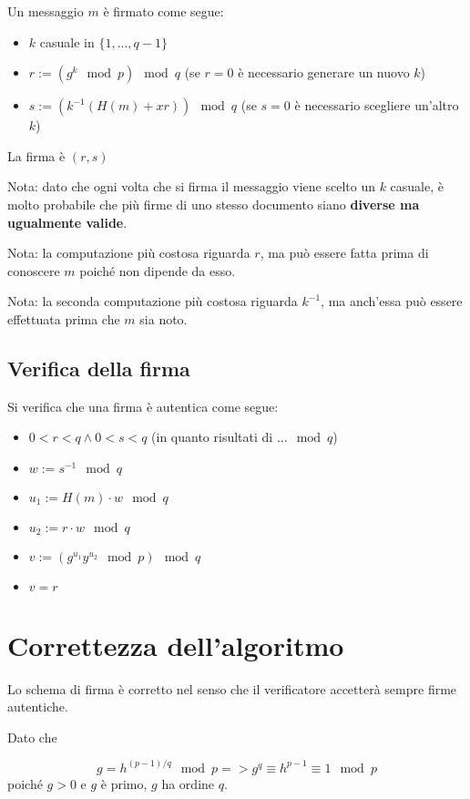 \documentclass[14pt]{extarticle}
\begin{document}
    Un messaggio $m$ è firmato come segue:
    \begin{itemize}
        \item $k$ casuale in $\{1, ..., q-1\}$
        \item $r := (g^k \mod p) \mod q$ (se $r = 0$ è necessario generare un nuovo $k$)
        \item $s := (k^{-1}(H(m) + xr)) \mod q$ (se $s = 0$ è necessario scegliere un'altro $k$)
    \end{itemize}
    La firma è $(r, s)$

    \bigskip
    Nota: dato che ogni volta che si firma il messaggio viene scelto un $k$ casuale, è molto probabile che più firme di uno stesso documento siano \textbf{diverse ma ugualmente valide}.

    \bigskip
    Nota: la computazione più costosa riguarda $r$, ma può essere fatta prima di conoscere $m$ poiché non dipende da esso.

    \bigskip
    Nota: la seconda computazione più costosa riguarda $k^{-1}$, ma anch'essa può essere effettuata prima che $m$ sia noto.

    \subsection{Verifica della firma}

    Si verifica che una firma è autentica come segue:
    \begin{itemize}
        \item $0 < r < q \wedge 0 < s < q$ (in quanto risultati di $... \mod q$)
        \item $w := s^{-1} \mod q$
        \item $u_1 := H(m) \cdot w \mod q$
        \item $u_2 := r \cdot w \mod q$
        \item $v := (g^{u_1}y^{u_2} \mod p) \mod q$
        \item $v = r$
    \end{itemize}

    \section{Correttezza dell'algoritmo}

    Lo schema di firma è corretto nel senso che il verificatore accetterà sempre firme autentiche.

    \bigskip
    Dato che
    
    \begin{equation*}
        g = h^{(p-1)/q} \mod p
        =>
        g^q \equiv h^{p-1} \equiv 1 \mod p
    \end{equation*}
    poiché $g > 0$ e $g$ è primo, $g$ ha ordine $q$.
\end{document}
